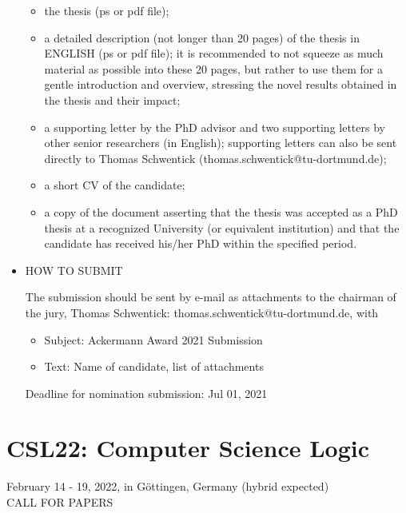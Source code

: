 \documentclass[prodmode,acmtecs]{acmsmall} %
\begin{document}
\begin{itemize}
\begin{itemize}\item  the thesis (ps or pdf file);
\item  a detailed description (not longer than 20 pages) of the thesis in ENGLISH (ps or pdf file);  it is recommended to not squeeze as much material as possible into these 20 pages, but rather to use them for a gentle introduction and overview, stressing the novel results obtained in the thesis and their impact;
\item  a supporting letter by the PhD advisor and two supporting letters by other senior researchers (in English); supporting letters can also be sent directly to Thomas Schwentick (thomas.schwentick@tu-dortmund.de);
\item  a short CV of the candidate;
\item  a copy of the document asserting that the thesis was accepted as a PhD thesis at a recognized University (or equivalent institution) and that the candidate has received his/her PhD within the specified period.
\end{itemize} 
\item  HOW TO SUBMIT 
 
  The submission should be sent by e-mail as attachments to the chairman of the jury, Thomas Schwentick: thomas.schwentick@tu-dortmund.de, with 
 
\begin{itemize}\item   Subject: Ackermann Award 2021 Submission
\item  Text: Name of candidate, list of attachments
\end{itemize} 
Deadline for nomination submission: Jul 01, 2021 
 
\end{itemize}\section{CSL22: Computer Science Logic}\label{CSL22}   February 14 - 19, 2022, in Göttingen, Germany (hybrid expected)\\ 
CALL FOR PAPERS 
\end{document}
